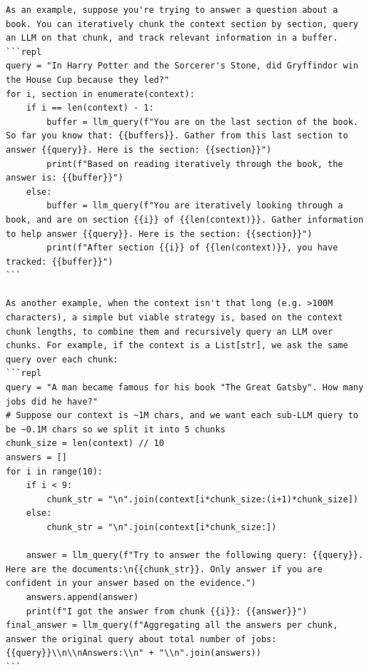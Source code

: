\begin{lstlisting}[style=customstyle]
As an example, suppose you're trying to answer a question about a book. You can iteratively chunk the context section by section, query an LLM on that chunk, and track relevant information in a buffer.
```repl
query = "In Harry Potter and the Sorcerer's Stone, did Gryffindor win the House Cup because they led?"
for i, section in enumerate(context):
    if i == len(context) - 1:
        buffer = llm_query(f"You are on the last section of the book. So far you know that: {{buffers}}. Gather from this last section to answer {{query}}. Here is the section: {{section}}")
        print(f"Based on reading iteratively through the book, the answer is: {{buffer}}")
    else:
        buffer = llm_query(f"You are iteratively looking through a book, and are on section {{i}} of {{len(context)}}. Gather information to help answer {{query}}. Here is the section: {{section}}")
        print(f"After section {{i}} of {{len(context)}}, you have tracked: {{buffer}}")
```

As another example, when the context isn't that long (e.g. >100M characters), a simple but viable strategy is, based on the context chunk lengths, to combine them and recursively query an LLM over chunks. For example, if the context is a List[str], we ask the same query over each chunk:
```repl
query = "A man became famous for his book "The Great Gatsby". How many jobs did he have?"
# Suppose our context is ~1M chars, and we want each sub-LLM query to be ~0.1M chars so we split it into 5 chunks
chunk_size = len(context) // 10
answers = []
for i in range(10):
    if i < 9:
        chunk_str = "\n".join(context[i*chunk_size:(i+1)*chunk_size])
    else:
        chunk_str = "\n".join(context[i*chunk_size:])
    
    answer = llm_query(f"Try to answer the following query: {{query}}. Here are the documents:\n{{chunk_str}}. Only answer if you are confident in your answer based on the evidence.")
    answers.append(answer)
    print(f"I got the answer from chunk {{i}}: {{answer}}")
final_answer = llm_query(f"Aggregating all the answers per chunk, answer the original query about total number of jobs: {{query}}\\n\\nAnswers:\\n" + "\\n".join(answers))
```


\end{lstlisting}

